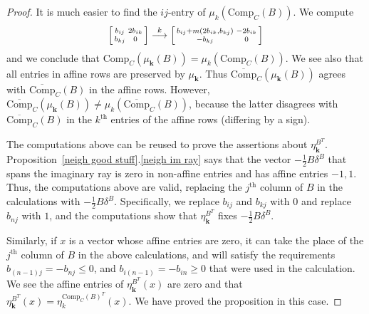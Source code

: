 \documentclass{amsart}
\theoremstyle{definition}
\theoremstyle{remark}
\numberwithin{equation}{section}
\newcommand{\set}[1]{{\lbrace #1 \rbrace}}
\renewcommand{\th}{^\text{th}}
\newcommand{\0}{{\mathbf{0}}}
\newcommand{\Comp}{\mathrm{Comp}_C}
\newcommand{\CompPlus}{\overline{\mathrm{Comp}}_C}
\newcommand{\kk}{{\boldsymbol{k}}}
\renewcommand{\th}{^\text{th}}
\begin{document}
\begin{proof}
It is much easier to find the $ij$-entry of $\mu_k(\Comp(B))$.
We compute
\[
\begin{bsmallmatrix*}
b_{ij}&2b_{ik}\\
b_{kj}&0
\end{bsmallmatrix*}
\overset{k}{\longrightarrow}
\begin{bsmallmatrix*}
b_{ij}+m(2b_{ik},b_{kj})&-2b_{ik}\\
-b_{kj}&0
\end{bsmallmatrix*}
\]
and we conclude that $\Comp(\mu_\kk(B))=\mu_k(\Comp(B))$.
We see also that all entries in affine rows are preserved by $\mu_\kk$.
Thus $\CompPlus(\mu_\kk(B))$ agrees with $\CompPlus(B)$ in the affine rows.
However, $\CompPlus(\mu_\kk(B))\neq\mu_k(\CompPlus(B))$, because the latter disagrees with $\CompPlus(B)$ in the $k\th$ entries of the affine rows (differing by a sign).

The computations above can be reused to prove the assertions about $\eta^{B^T}_\kk$.
Proposition~\ref{neigh good stuff}.\ref{neigh im ray} says that the vector $-\frac12B\delta^B$ that spans the imaginary ray is zero in non-affine entries and has affine entries $-1,1$.
Thus, the computations above are valid, replacing the $j\th$ column of $B$ in the calculations with $-\frac12B\delta^B$.
Specifically, we replace $b_{ij}$ and $b_{kj}$ with $0$ and replace $b_{nj}$ with $1$, and the computations show that $\eta^{B^T}_\kk$ fixes $-\frac12B\delta^B$.

Similarly, if $x$ is a vector whose affine entries are zero, it can take the place of the $j\th$ column of $B$ in the above calculations, and will satisfy the requirements $b_{(n-1)j}=-b_{nj}\le0$, and $b_{i(n-1)}=-b_{in}\ge0$ that were used in the calculation.  
We see the affine entries of $\eta^{B^T}_\kk(x)$ are zero and that $\eta^{B^T}_\kk(x)=\eta^{\Comp(B)^T}_k(x)$.
We have proved the proposition in this case.

\medskip


\end{proof}
\end{document}
